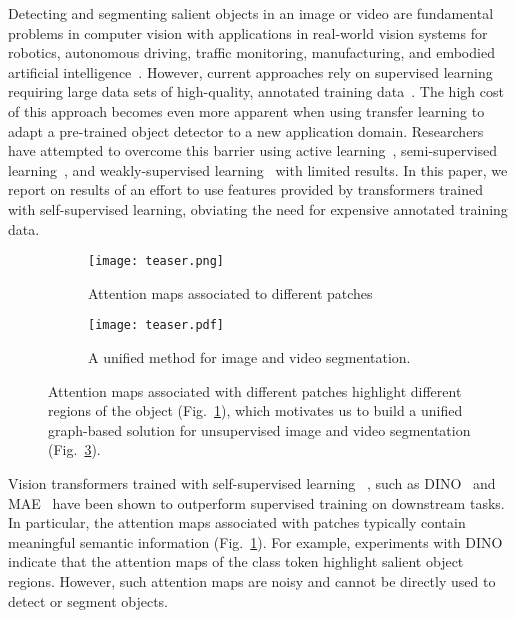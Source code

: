 \documentclass[twocolumn]{article}
\begin{document}
Detecting and segmenting salient objects in an image or video are fundamental problems in computer vision with applications in real-world vision systems for robotics, autonomous driving, traffic monitoring, manufacturing, and embodied artificial intelligence~\cite{wu2017squeezedet,geiger2013vision,xia2018dota}. However, current approaches rely on supervised learning requiring large data sets of high-quality, annotated training data~\cite{lin2014microsoft}. The high cost of this approach becomes even more apparent when using transfer learning to adapt a pre-trained object detector to a new application domain. Researchers have attempted to overcome this barrier using active learning~\cite{aghdam2019active, siddiqui2020viewal}, semi-supervised learning~\cite{liu2021unbiased, chen2021semi}, and weakly-supervised learning~\cite{ren2020instance, ke2021universal} with limited results.
In this paper, we report on results of an effort to use features provided by transformers trained with self-supervised learning, obviating the need for expensive annotated training data. 

\begin{figure}[!t]
	\centering
	 \begin{subfigure}[b]{\linewidth}
         \centering
         \texttt{[image: teaser.png]}
         \caption{Attention maps associated to different patches}
         \label{fig:teaser_a}
     \end{subfigure}
     \hfill
     \begin{subfigure}[b]{\linewidth}
         \centering
         \texttt{[image: teaser.pdf]}
         \caption{A unified method for image and video segmentation.}
         \label{fig:teaser}
     \end{subfigure}
    \vspace{-2mm} 
	\caption{Attention maps associated with different patches highlight different regions of the object (Fig.~\ref{fig:teaser_a}), which motivates us to build a unified graph-based solution for unsupervised image and video segmentation (Fig.~\ref{fig:teaser}).}
\end{figure}


Vision transformers trained with self-supervised learning ~\cite{dosovitskiy2020image,caron2021emerging}, such as DINO~\cite{caron2021emerging} and MAE~\cite{he2022masked, feichtenhofer2022masked, tong2022videomae} have been shown to outperform supervised training on downstream tasks. 
In particular, the attention maps associated with patches typically contain meaningful semantic information (Fig.~\ref{fig:teaser_a}). 
For example, experiments with DINO~\cite{caron2021emerging} indicate that the attention maps of the class token highlight salient object regions. 
However, such attention maps are noisy and cannot be directly used to detect or segment objects. 
\end{document}
